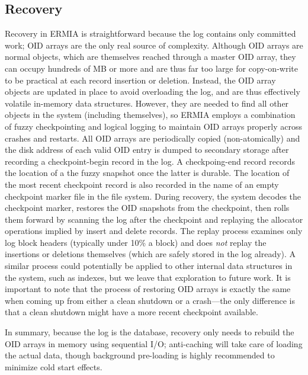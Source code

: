\subsection{Recovery}

Recovery in ERMIA is straightforward because the log contains only committed work; OID arrays are the only real source of complexity. Although OID arrays are normal objects, which are themselves reached through a master OID array, they can occupy hundreds of MB or more and are thus far too large for copy-on-write to be practical at each record insertion or deletion. Instead, the OID array objects are updated in place to avoid overloading the log, and are thus effectively volatile in-memory data structures. However, they are needed to find all other objects in the system (including themselves), so ERMIA employs a combination of fuzzy checkpointing and logical logging to maintain OID arrays properly across crashes and restarts. All OID arrays are periodically copied (non-atomically) and the disk address of each valid OID entry is dumped to secondary storage after recording a checkpoint-begin record in the log. A checkpoing-end record records the location of a the fuzzy snapshot once the latter is durable. The location of the most recent checkpoint record is also recorded in the name of an empty checkpoint marker file in the file system. During recovery, the system decodes the checkpoint marker, restores the OID snapshots from the checkpoint, then rolls them forward by scanning the log after the checkpoint and replaying the allocator operations implied by insert and delete records. The replay process examines only log block headers (typically under 10\% a block) and does {\em not} replay the insertions or deletions themselves (which are safely stored in the log already). A similar process could potentially be applied to other internal data structures in the system, such as indexes, but we leave that exploration to future work. It is important to note that the process of restoring OID arrays is exactly the same when coming up from either a clean shutdown or a crash---the only difference is that a clean shutdown might have a more recent checkpoint available.

In summary, because the log is the database, recovery only needs to rebuild the OID arrays in memory using sequential I/O; anti-caching will take care of loading the actual data, though background pre-loading is highly recommended to minimize cold start effects.

%
